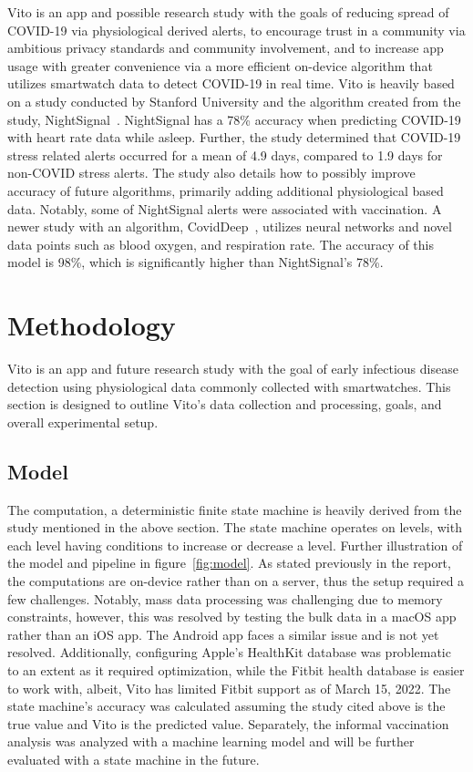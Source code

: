 \documentclass{article}
\newcommand\todo[1]{\textcolor{blue}{#1}}
\begin{document}
Vito is an app and possible research study with the goals of reducing spread of COVID-19 via physiological derived alerts, to encourage trust in a community via ambitious privacy standards and community involvement, and to increase app usage with greater convenience via a more efficient on-device algorithm that utilizes smartwatch data to detect COVID-19 in real time. Vito is heavily based on a study conducted by Stanford University and the algorithm created from the study, NightSignal~\cite{NightSignal}. NightSignal has a 78\% accuracy when predicting COVID-19 with heart rate data while asleep.  Further, the study determined that COVID-19 stress related alerts occurred for a mean of 4.9 days, compared to 1.9 days for non-COVID stress alerts.  The study also details how to possibly improve accuracy of future algorithms, primarily adding additional physiological based data.  Notably, some of NightSignal alerts were associated with vaccination.  A newer study with an algorithm, CovidDeep~\cite{coviddeep}, utilizes neural networks and novel data points such as blood oxygen, and respiration rate.  The accuracy of this model is 98\%, which is significantly higher than NightSignal's 78\%. 

\section{Methodology}
Vito is an app and future research study with the goal of early infectious disease detection using physiological data commonly collected with smartwatches.  This section is designed to outline Vito's data collection and processing, goals, and overall experimental setup.

\subsection{Model}
The computation, a deterministic finite state machine is heavily derived from the study mentioned in the above section. The state machine operates on levels, with each level having conditions to increase or decrease a level. Further illustration of the model and pipeline in figure~\ref{fig:model}.  As stated previously in the report, the computations are on-device rather than on a server, thus the setup required a few challenges.  Notably, mass data processing was challenging due to memory constraints, however, this was resolved by testing the bulk data in a macOS app rather than an iOS app.  The Android app faces a similar issue and is not yet resolved.  Additionally, configuring Apple's HealthKit database was problematic to an extent as it required optimization, while the Fitbit health database is easier to work with, albeit, Vito has limited Fitbit support as of March 15, 2022.  The state machine's accuracy was calculated assuming the study cited above is the true value and Vito is the predicted value. Separately, the informal vaccination analysis was analyzed with a machine learning model and will be further evaluated with a state machine in the future.  
\end{document}

